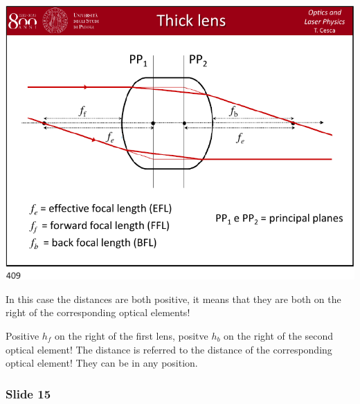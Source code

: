 \documentclass[../main/main.tex]{subfiles}
\begin{document}
\begin{minipage}[]{0.5\linewidth}
\centering
\includegraphics[page=14,width=1\textwidth]{../lessons/pdf_file/20_lecture.pdf}
\end{minipage}
\hspace{0.3cm}\vspace{0.3cm}
\begin{minipage}[c]{0.47\linewidth}

In this case the distances are both positive, it means that they are both on the right of the corresponding optical elements!

Positive \( h_f \) on the right of the first lens, positve \( h_b \) on the right of the second optical element! The distance is referred to the distance of the corresponding optical element!
They can be in any position.


\end{minipage}

\subsubsection*{Slide 15}
\end{document}
